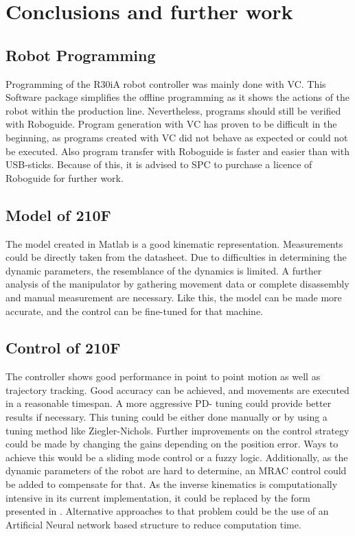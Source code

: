 \chapter{Conclusions and further work}

\section{Robot Programming}
Programming of the R30iA robot controller was mainly done with \ac{VC}. This Software package simplifies the offline programming as it shows the actions of the robot within the production line. Nevertheless, programs should still be verified with Roboguide. Program generation with \ac{VC} has proven to be difficult in the beginning, as programs created with \ac{VC} did not behave as expected or could not be executed. Also program transfer with Roboguide is faster and easier than with USB-sticks. Because of this, it is advised to \ac{SPC} to purchase a licence of Roboguide for further work. 

\section{Model of 210F}
The model created in Matlab is a good kinematic representation. Measurements could be directly taken from the datasheet. Due to difficulties in determining the dynamic parameters, the resemblance of the dynamics is limited.   A further analysis of the manipulator by gathering movement data or complete disassembly and manual measurement are necessary. Like this, the model can be made more accurate, and the control can be fine-tuned for that machine.\\

\section{Control of 210F}
The controller shows good performance in point to point motion as well as trajectory tracking. Good accuracy can be achieved, and movements are executed in a reasonable timespan. A more aggressive PD- tuning could provide better results if necessary. This tuning could be either done manually or by using a tuning method like Ziegler-Nichols.
Further improvements on the control strategy could be made by changing the gains depending on the position error. Ways to achieve this would be a sliding mode control or a fuzzy logic. Additionally, as the dynamic parameters of the robot are hard to determine, an \ac{MRAC} control could be added to compensate for that. 
As the inverse kinematics is computationally intensive in its current implementation, it could be replaced by the form presented in . Alternative approaches to that problem could be the use of an Artificial Neural network based structure to reduce computation time. 

